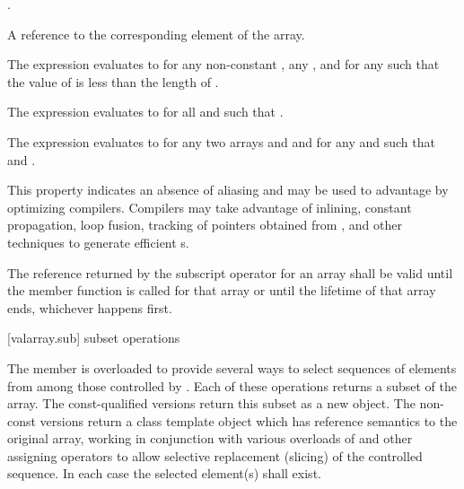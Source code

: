 \begin{itemdescr}
\pnum
\requires
{}.

\pnum
\returns
A reference to the corresponding element of the array.
\begin{note}
The expression 
evaluates to  for any non-constant ,
any , and for any 
such that the value of  is less than the length of .
\end{note}

\pnum
\remarks
The expression 
evaluates to  for all  and 
such that .

\pnum
The expression 
evaluates to  for any two arrays
 and  and for any
 and 
such that 
and .
\begin{note} This property indicates an absence of aliasing and may be used to
advantage by optimizing compilers. Compilers may take advantage
of inlining, constant propagation, loop fusion,
tracking of pointers obtained from
,
and other techniques to generate efficient
s.
\end{note}

\pnum
The reference returned by the subscript operator for an array shall
be valid until the member function
 is called for that array or until the lifetime of
that array ends, whichever happens first.
\end{itemdescr}

[valarray.sub]{ subset operations}

%
\pnum
The member  is overloaded to provide several ways to select
sequences of elements from among those controlled by . Each of these
operations returns a subset of the array. The const-qualified versions return this
subset as a new  object. The non-const versions return a class
template object which has reference semantics to the original array, working in
conjunction with various overloads of  and other assigning
operators to allow selective replacement (slicing) of the controlled sequence.
In each case the selected element(s) shall exist.


